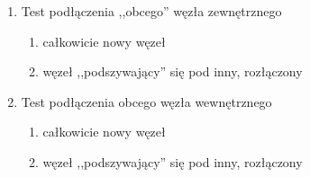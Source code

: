 \begin{enumerate}
\item Test podłączenia ,,obcego'' węzła zewnętrznego
	\begin{enumerate}
	\item całkowicie nowy węzeł
	\item węzeł ,,podszywający'' się pod inny, rozłączony
	\end{enumerate}
\item Test podłączenia obcego węzła wewnętrznego
	\begin{enumerate}
	\item całkowicie nowy węzeł
	\item węzeł ,,podszywający'' się pod inny, rozłączony
	\end{enumerate}

\end{enumerate}